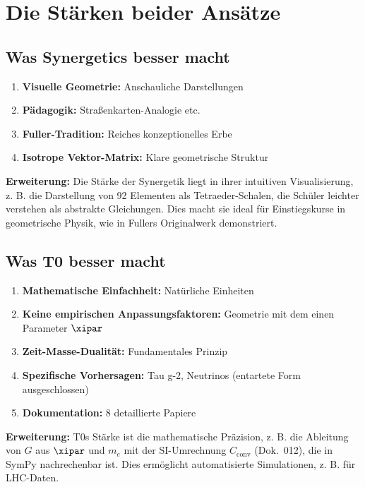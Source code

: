 	\section{Die Stärken beider Ansätze}
	
	\subsection{Was Synergetics besser macht}
	
	\begin{enumerate}
		\item \textbf{Visuelle Geometrie:} Anschauliche Darstellungen
		\item \textbf{Pädagogik:} Straßenkarten-Analogie etc.
		\item \textbf{Fuller-Tradition:} Reiches konzeptionelles Erbe
		\item \textbf{Isotrope Vektor-Matrix:} Klare geometrische Struktur
	\end{enumerate}
	
	\textbf{Erweiterung:} Die Stärke der Synergetik liegt in ihrer intuitiven Visualisierung, z. B. die Darstellung von 92 Elementen als Tetraeder-Schalen, die Schüler leichter verstehen als abstrakte Gleichungen. Dies macht sie ideal für Einstiegskurse in geometrische Physik, wie in Fullers Originalwerk demonstriert.
	
	\subsection{Was T0 besser macht}
	
	\begin{enumerate}
		\item \textbf{Mathematische Einfachheit:} Natürliche Einheiten
		\item \textbf{Keine empirischen Anpassungsfaktoren:} Geometrie mit dem einen Parameter $\xipar$
		\item \textbf{Zeit-Masse-Dualität:} Fundamentales Prinzip
		\item \textbf{Spezifische Vorhersagen:} Tau g-2, Neutrinos (entartete Form ausgeschlossen)
		\item \textbf{Dokumentation:} 8 detaillierte Papiere
	\end{enumerate}
	
	\textbf{Erweiterung:} T0s Stärke ist die mathematische Präzision, z. B. die Ableitung von $G$ aus $\xipar$ und $m_e$ mit der SI-Umrechnung $C_{\text{conv}}$ (Dok.~012), die in SymPy nachrechenbar ist. Dies ermöglicht automatisierte Simulationen, z. B. für LHC-Daten.
	

